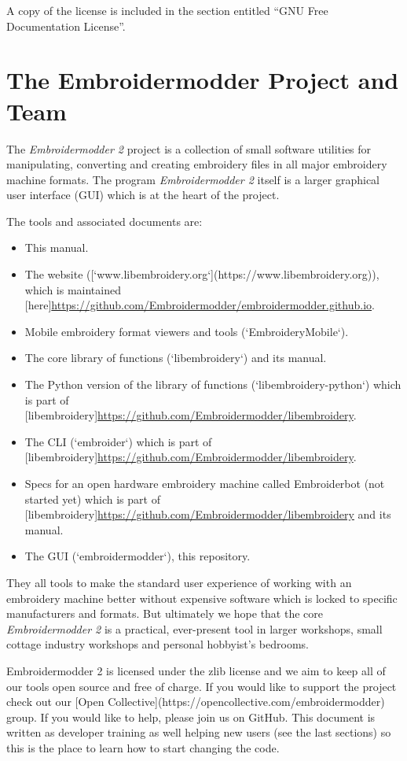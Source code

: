 A copy of the license is included in the section entitled ``GNU Free Documentation License''.


\section{The Embroidermodder Project and Team}

The \textit{Embroidermodder 2} project is a collection of small software utilities for
manipulating, converting and creating embroidery files in all major embroidery
machine formats. The program \textit{Embroidermodder 2} itself is a larger graphical
user interface (GUI) which is at the heart of the project.

The tools and associated documents are:

\begin{itemize}
\item This manual.
\item The website ([`www.libembroidery.org`](https://www.libembroidery.org)), which is maintained [here]\url{https://github.com/Embroidermodder/embroidermodder.github.io}.
\item Mobile embroidery format viewers and tools (`EmbroideryMobile`).
\item The core library of functions (`libembroidery`) and its manual.
\item The Python version of the library of functions (`libembroidery-python`) which is part of [libembroidery]\url{https://github.com/Embroidermodder/libembroidery}.
\item The CLI (`embroider`) which is part of [libembroidery]\url{https://github.com/Embroidermodder/libembroidery}.
\item Specs for an open hardware embroidery machine called Embroiderbot (not started yet) which is part of [libembroidery]\url{https://github.com/Embroidermodder/libembroidery} and its manual.
\item The GUI (`embroidermodder`), this repository.
\end{itemize}

They all tools to make the standard
user experience of working with an embroidery machine better without expensive
software which is locked to specific manufacturers and formats. But ultimately
we hope that the core \emph{Embroidermodder 2} is a practical, ever-present tool in
larger workshops, small cottage industry workshops and personal hobbyist's
bedrooms.

Embroidermodder 2 is licensed under the zlib license and we aim to keep all of
our tools open source and free of charge. If you would like to support the
project check out our [Open Collective](https://opencollective.com/embroidermodder) group. If you would like to help, please
join us on GitHub. This document is written as developer training as well
helping new users (see the last sections) so this is the place to learn how
to start changing the code.

